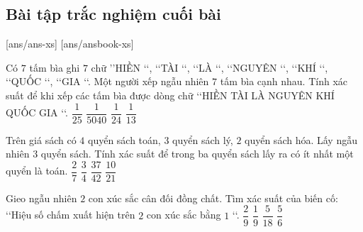 \subsection{Bài tập trắc nghiệm cuối bài}
\setcounter{ex}{0}
[ans/ans-xs]
[ans/ansbook-xs]
\begin{ex}%
	Có $7$ tấm bìa ghi $7$ chữ \rq\rq HIỀN \lq\lq , \lq\lq  TÀI \lq\lq , \lq\lq  LÀ \lq\lq , \lq\lq  NGUYÊN \lq\lq , \lq\lq  KHÍ \lq\lq , \lq\lq  QUỐC \lq\lq , \lq\lq  GIA \lq\lq . Một người xếp ngẫu nhiên $7$ tấm bìa cạnh nhau. Tính xác suất để khi xếp các tấm bìa được dòng chữ \lq\lq  HIỀN TÀI LÀ NGUYÊN KHÍ QUỐC GIA \lq\lq . 
	\choice
	{$\dfrac{1}{25}$}
	{\True $\dfrac{1}{5040}$}
	{$\dfrac{1}{24}$}
	{$\dfrac{1}{13}$}
\end{ex}

\begin{ex}%
	Trên giá sách có $4$ quyển sách toán, $3$ quyển sách lý, $2$ quyển sách hóa. Lấy ngẫu nhiên $3$ quyển sách. Tính xác suất để trong ba quyển sách lấy ra có ít nhất một quyển là toán. 
	\choice
	{$\dfrac{2}{7}$}
	{$\dfrac{3}{4}$}
	{\True $\dfrac{37}{42}$}
	{$\dfrac{10}{21}$}
\end{ex}

\begin{ex}%
	Gieo ngẫu nhiên $2$ con xúc sắc cân đối đồng chất. Tìm xác suất của biến cố$\colon$ \lq\lq  Hiệu số chấm xuất hiện trên $2$ con xúc sắc bằng $1$ \lq\lq . 
	\choice
	{$\dfrac{2}{9}$}
	{$\dfrac{1}{9}$}
	{\True $\dfrac{5}{18}$}
	{$\dfrac{5}{6}$}
\end{ex}

